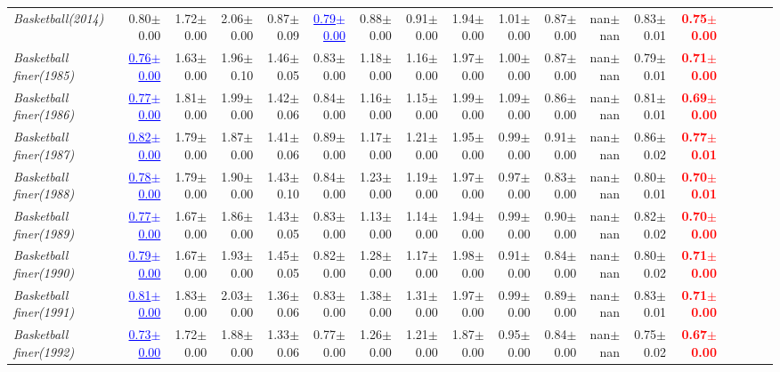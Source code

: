\documentclass[nohyperref]{article}
\theoremstyle{plain}
\theoremstyle{definition}
\theoremstyle{remark}
\newcommand{\red}[1]{\textcolor{red}{\textbf{#1}}}
\newcommand{\blue}[1]{\textcolor{blue}{\underline{#1}}}
\begin{document}
\begin{table*}[!ht]
{\begin{tabular}{lrrrrrrrrrrrrrrrrr}
			{\it Basketball(2014)} & 0.80$\pm$0.00 & 1.72$\pm$0.00 & 2.06$\pm$0.00 & 0.87$\pm$0.09 & \blue{0.79$\pm$0.00} & 0.88$\pm$0.00 & 0.91$\pm$0.00 & 1.94$\pm$0.00 & 1.01$\pm$0.00 & 0.87$\pm$0.00 & nan$\pm$nan & 0.83$\pm$0.01 & \red{0.75$\pm$0.00} \\
			{\it Basketball finer(1985)} & \blue{0.76$\pm$0.00} & 1.63$\pm$0.00 & 1.96$\pm$0.10 & 1.46$\pm$0.05 & 0.83$\pm$0.00 & 1.18$\pm$0.00 & 1.16$\pm$0.00 & 1.97$\pm$0.00 & 1.00$\pm$0.00 & 0.87$\pm$0.00 & nan$\pm$nan & 0.79$\pm$0.01 & \red{0.71$\pm$0.00} \\
			{\it Basketball finer(1986)} & \blue{0.77$\pm$0.00} & 1.81$\pm$0.00 & 1.99$\pm$0.00 & 1.42$\pm$0.06 & 0.84$\pm$0.00 & 1.16$\pm$0.00 & 1.15$\pm$0.00 & 1.99$\pm$0.00 & 1.09$\pm$0.00 & 0.86$\pm$0.00 & nan$\pm$nan & 0.81$\pm$0.01 & \red{0.69$\pm$0.00} \\
			{\it Basketball finer(1987)} & \blue{0.82$\pm$0.00} & 1.79$\pm$0.00 & 1.87$\pm$0.00 & 1.41$\pm$0.06 & 0.89$\pm$0.00 & 1.17$\pm$0.00 & 1.21$\pm$0.00 & 1.95$\pm$0.00 & 0.99$\pm$0.00 & 0.91$\pm$0.00 & nan$\pm$nan & 0.86$\pm$0.02 & \red{0.77$\pm$0.01} \\
			{\it Basketball finer(1988)} & \blue{0.78$\pm$0.00} & 1.79$\pm$0.00 & 1.90$\pm$0.00 & 1.43$\pm$0.10 & 0.84$\pm$0.00 & 1.23$\pm$0.00 & 1.19$\pm$0.00 & 1.97$\pm$0.00 & 0.97$\pm$0.00 & 0.83$\pm$0.00 & nan$\pm$nan & 0.80$\pm$0.01 & \red{0.70$\pm$0.01} \\
			{\it Basketball finer(1989)} & \blue{0.77$\pm$0.00} & 1.67$\pm$0.00 & 1.86$\pm$0.00 & 1.43$\pm$0.05 & 0.83$\pm$0.00 & 1.13$\pm$0.00 & 1.14$\pm$0.00 & 1.94$\pm$0.00 & 0.99$\pm$0.00 & 0.90$\pm$0.00 & nan$\pm$nan & 0.82$\pm$0.02 & \red{0.70$\pm$0.00} \\
			{\it Basketball finer(1990)} & \blue{0.79$\pm$0.00} & 1.67$\pm$0.00 & 1.93$\pm$0.00 & 1.45$\pm$0.05 & 0.82$\pm$0.00 & 1.28$\pm$0.00 & 1.17$\pm$0.00 & 1.98$\pm$0.00 & 0.91$\pm$0.00 & 0.84$\pm$0.00 & nan$\pm$nan & 0.80$\pm$0.02 & \red{0.71$\pm$0.00} \\
			{\it Basketball finer(1991)} & \blue{0.81$\pm$0.00} & 1.83$\pm$0.00 & 2.03$\pm$0.00 & 1.36$\pm$0.06 & 0.83$\pm$0.00 & 1.38$\pm$0.00 & 1.31$\pm$0.00 & 1.97$\pm$0.00 & 0.99$\pm$0.00 & 0.89$\pm$0.00 & nan$\pm$nan & 0.83$\pm$0.01 & \red{0.71$\pm$0.00} \\
			{\it Basketball finer(1992)} & \blue{0.73$\pm$0.00} & 1.72$\pm$0.00 & 1.88$\pm$0.00 & 1.33$\pm$0.06 & 0.77$\pm$0.00 & 1.26$\pm$0.00 & 1.21$\pm$0.00 & 1.87$\pm$0.00 & 0.95$\pm$0.00 & 0.84$\pm$0.00 & nan$\pm$nan & 0.75$\pm$0.02 & \red{0.67$\pm$0.00} \\

\end{tabular}}
\end{table*}
\end{document}
